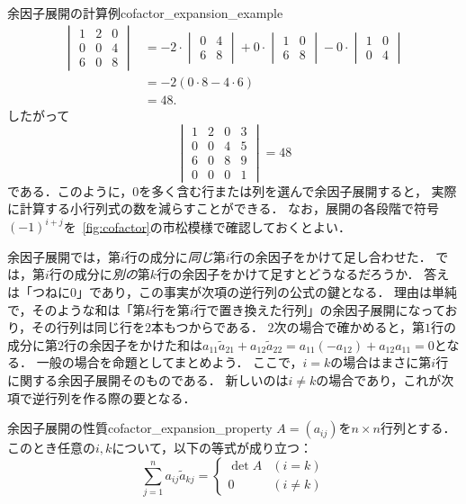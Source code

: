 \begin{example}{余因子展開の計算例}{cofactor_expansion_example}
\begin{align*}
\begin{vmatrix}
    1 & 2 & 0 \\
    0 & 0 & 4 \\
    6 & 0 & 8
  \end{vmatrix}
  &=
  -2 \cdot
  \begin{vmatrix}
    0 & 4 \\
    6 & 8
  \end{vmatrix}
  +0 \cdot
  \begin{vmatrix}
    1 & 0 \\
    6 & 8
  \end{vmatrix}
  -0 \cdot
  \begin{vmatrix}
    1 & 0 \\
    0 & 4
  \end{vmatrix} \\
  &=
  -2(0 \cdot 8 - 4 \cdot 6) \\
  &= 48.
  \end{align*}
  したがって
  \[
  \begin{vmatrix}
    1 & 2 & 0 & 3 \\
    0 & 0 & 4 & 5 \\
    6 & 0 & 8 & 9 \\
    0 & 0 & 0 & 1
  \end{vmatrix}
  =48
  \]
  である．このように，$0$を多く含む行または列を選んで余因子展開すると，
  実際に計算する小行列式の数を減らすことができる．
  なお，展開の各段階で符号$(-1)^{i+j}$を\figurename~\ref{fig:cofactor}の市松模様で確認しておくとよい．
\end{example}

余因子展開では，第$i$行の成分に\emph{同じ}第$i$行の余因子をかけて足し合わせた．
では，第$i$行の成分に\emph{別の}第$k$行の余因子をかけて足すとどうなるだろうか．
答えは「つねに$0$」であり，この事実が次項の逆行列の公式の鍵となる．
理由は単純で，そのような和は「第$k$行を第$i$行で置き換えた行列」の余因子展開になっており，その行列は同じ行を$2$本もつからである．
$2$次の場合で確かめると，第$1$行の成分に第$2$行の余因子をかけた和は$a_{11}\tilde{a}_{21} + a_{12}\tilde{a}_{22} = a_{11}(-a_{12}) + a_{12}a_{11} = 0$となる．
一般の場合を命題としてまとめよう．
ここで，$i = k$の場合はまさに第$i$行に関する余因子展開そのものである．
新しいのは$i \ne k$の場合であり，これが次項で逆行列を作る際の要となる．

\begin{prop}{余因子展開の性質}{cofactor_expansion_property}
  $A = (a_{ij})$を$n \times n$行列とする．このとき任意の$i,k$について，以下の等式が成り立つ：
  \[
  \sum_{j=1}^{n} a_{ij} \tilde{a}_{kj} = \begin{cases} \det A & (i=k) \\ 0 & (i \ne k) \end{cases}
  \]
\end{prop}

